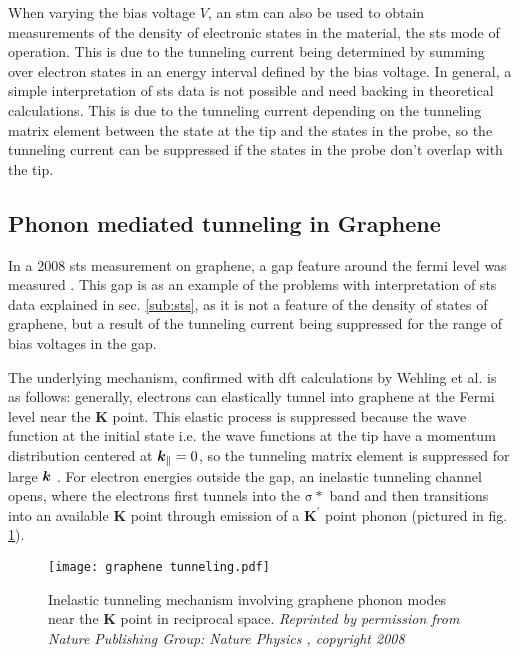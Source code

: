 \documentclass[main.tex]{subfiles}
\begin{document}
When varying the bias voltage \(V\), an \acrshort{stm} can also be used to obtain measurements of the density of electronic states in the material, the \acrshort{sts} mode of operation.
This is due to the tunneling current being determined by summing over electron states in an energy interval defined by the bias voltage.
In general, a simple interpretation of \acrshort{sts} data is not possible and need backing in theoretical calculations.
This is due to the tunneling current depending on the tunneling matrix element between the state at the tip and the states in the probe, so the tunneling current can be suppressed if the states in the probe don't overlap with the tip.


\subsection{Phonon mediated tunneling in Graphene}\label{sub:tunneling_graphene}

In a 2008 \acrshort{sts} measurement on graphene, a gap feature around the fermi level was measured \cite{zhang_giant_2008}.
This gap is as an example of the problems with interpretation of \acrshort{sts} data explained in sec. \ref{sub:sts}, as it is not a feature of the density of states of graphene, but a result of the tunneling current being suppressed for the range of bias voltages in the gap.

The underlying mechanism, confirmed with \acrshort{dft} calculations by Wehling et al. \cite{wehling_phonon-mediated_2008} is as follows:
generally, electrons can elastically tunnel into graphene at the Fermi level near the \(\mathbf{K}\) point.
This elastic process is suppressed because the wave function at the initial state i.e. the wave functions at the tip have a momentum distribution centered at \(\vb*{k}_{\parallel} = 0\), so the tunneling matrix element is suppressed for large \(\vb*{k}\) \cite{vitali_phonon_2004}.
For electron energies outside the gap, an inelastic tunneling channel opens, where the electrons first tunnels into the \(\mathrm{\sigma}*\) band and then transitions into an available \(\mathbf{K}\) point through emission of a \(\mathbf{K}^{\prime}\) point phonon (pictured in fig. \ref{fig:graphene_tunneling}).

\begin{figure}[htb!]
    \centering
    \texttt{[image: graphene tunneling.pdf]}
    \caption{Inelastic tunneling mechanism involving graphene phonon modes near the \(\mathbf{K}\) point in reciprocal space. \emph{Reprinted by permission from Nature Publishing Group: Nature Physics \cite{zhang_giant_2008}, copyright 2008}}
    \label{fig:graphene_tunneling}
\end{figure}
\end{document}
